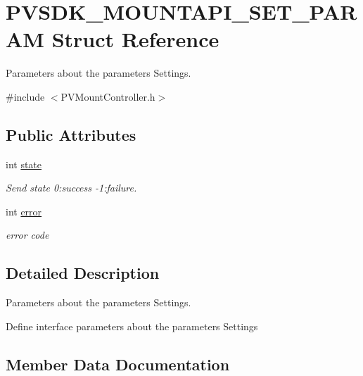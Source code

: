 \hypertarget{struct_p_v_s_d_k___m_o_u_n_t_a_p_i___s_e_t___p_a_r_a_m}{}\section{P\+V\+S\+D\+K\+\_\+\+M\+O\+U\+N\+T\+A\+P\+I\+\_\+\+S\+E\+T\+\_\+\+P\+A\+R\+AM Struct Reference}
\label{struct_p_v_s_d_k___m_o_u_n_t_a_p_i___s_e_t___p_a_r_a_m}


Parameters about the parameters Settings.  




{\ttfamily \#include $<$P\+V\+Mount\+Controller.\+h$>$}

\subsection*{Public Attributes}
\begin{DoxyCompactItemize}
\item 
int \hyperlink{struct_p_v_s_d_k___m_o_u_n_t_a_p_i___s_e_t___p_a_r_a_m_a1bd6f5f734c3eca3b69a064a4aa77445}{state}
\begin{DoxyCompactList}\small\item\em Send state 0\+:success -\/1\+:failure. \end{DoxyCompactList}\item 
int \hyperlink{struct_p_v_s_d_k___m_o_u_n_t_a_p_i___s_e_t___p_a_r_a_m_ae3e5874515c83354be6179262dcf2bad}{error}
\begin{DoxyCompactList}\small\item\em error code \end{DoxyCompactList}\end{DoxyCompactItemize}


\subsection{Detailed Description}
Parameters about the parameters Settings. 

Define interface parameters about the parameters Settings 

\subsection{Member Data Documentation}
\mbox{\label{struct_p_v_s_d_k___m_o_u_n_t_a_p_i___s_e_t___p_a_r_a_m_ae3e5874515c83354be6179262dcf2bad}} 
